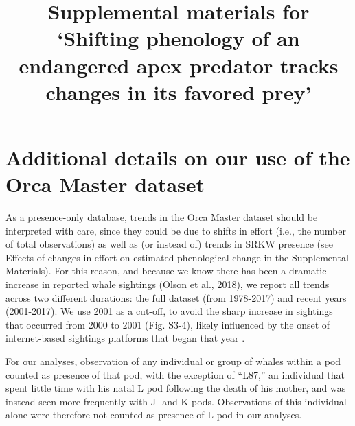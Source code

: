 \documentclass{article}
\begin{document}



\title{Supplemental materials for `Shifting phenology of an endangered apex predator tracks changes in its favored prey'}
\date{ }
\maketitle
\author{}
\renewcommand{\thetable}{S\arabic{table}}
\renewcommand{\thefigure}{S\arabic{figure}}
\section*{Additional details on our use of the Orca Master dataset}

As a presence-only database, trends in the Orca Master dataset should be interpreted with care, since they could be due to shifts in effort (i.e., the number of total observations) as well as (or instead of) trends in SRKW presence (see Effects of changes in effort on estimated phenological change in the Supplemental Materials). For this reason, and because we know there has been a dramatic increase in reported whale sightings (Olson et al., 2018), we report all trends across two different durations: the full dataset (from 1978-2017) and recent years (2001-2017). We use 2001 as a cut-off, to avoid the sharp increase in sightings that occurred from 2000 to 2001 (Fig. S3-4), likely influenced by the onset of internet-based sightings platforms that began that year \citep{hauser2007,olson2018}.

For our analyses, observation of any individual or group of whales within a pod counted as presence of that pod, with the exception of ``L87,'' an individual that spent little time with his natal L pod following the death of his mother, and was instead seen more frequently with J- and K-pods. Observations of this individual alone were therefore not counted as presence of L pod in our analyses.
 
\end{document}
